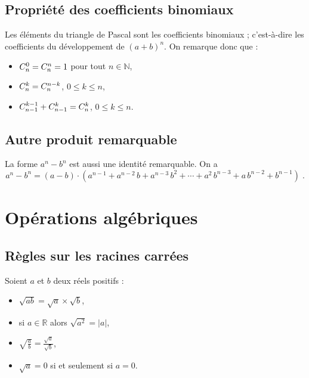 \subsection{Propri\'et\'e des coefficients binomiaux}
	Les \'el\'ements du triangle de Pascal sont les coefficients binomiaux ; 
	c'est-\`a-dire les coefficients du d\'eveloppement de $(a+b)^n$.
	On remarque donc que : 
	\begin{itemize}
		\item $C_{n}^{0} = C_{n}^{n} = 1$ pour tout $n\in\mathbb{N}$,
		\item $C_{n}^{k} = C_{n}^{n-k}$, $0 \leq k \leq n$,
		\item $C_{n-1}^{k-1} + C_{n-1}^{k} = C_{n}^{k}$, $0 \leq k \leq n$.
	\end{itemize}
\subsection{Autre produit remarquable} 
La forme $a^n - b^n$ est aussi une identit\'e remarquable. On a 
      \[
            a^n - b^n = (a-b) \cdot (a^{n-1} + a^{n-2}\, b + a^{n-3}\, b^2 + \cdots + a^2\, b^{n-3} + a\, b^{n-2} + b^{n-1} )
            \;.
      \]

\section{Op\'erations alg\'ebriques}
	\subsection{R\`egles sur les racines carr\'ees}
			Soient $a$ et $b$ deux r\'eels positifs : \newline
			\begin{minipage}[b]{.45\actualtextwidth}
				\begin{itemize}
					\item $\sqrt{a b} = \sqrt{a} \times \sqrt{b}$,
					\item si $a\in\mathbb{R}$ alors $\sqrt{a^2} = |a| $,
				\end{itemize}
			\end{minipage}
			\begin{minipage}[b]{.45\actualtextwidth}
				\begin{itemize}
					\item $\displaystyle \sqrt{\frac{a}{b}} = \frac{\sqrt{a}}{\sqrt{b}}$,
					\item $\sqrt{a} = 0 $ si et seulement si $a = 0$.
				\end{itemize}
			\end{minipage}
	
